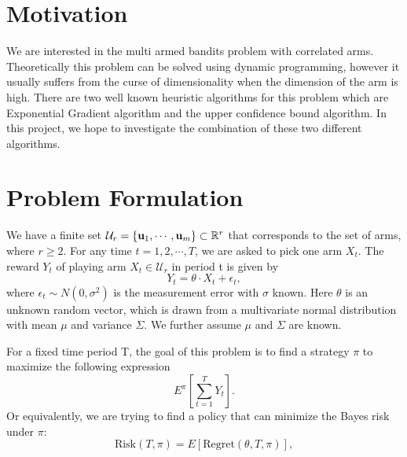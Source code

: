 \documentclass{article}
\begin{document}
 


\section{Motivation}
We are interested in the multi armed bandits problem with correlated arms. Theoretically this problem can be solved using dynamic programming, however it usually suffers from the curse of dimensionality when the dimension of the arm is high. There are two well known heuristic algorithms for this problem which are Exponential Gradient algorithm and the upper confidence bound algorithm. In this project, we hope to investigate the combination of these two different algorithms.


\section{Problem Formulation}
We have a finite set $\mathcal{U}_{r}=\{\bold{u}_{1},\cdots,\bold{u}_{m}\}\subset \mathbb{R}^{r}$ that corresponds to the set of arms, where $r\geq 2$. For any time $t=1,2,\cdots,T$, we are asked to pick one arm $X_{t}$. The reward $Y_{t}$ of playing arm $X_{t}\in \mathcal{U}_{r}$ in period t is given by
\begin{equation}
Y_{t} = \theta \cdot X_{t} + \epsilon_{t}, \nonumber
\end{equation}
where $\epsilon_{t}\sim N(0,\sigma^{2})$ is the measurement error with $\sigma$ known. Here $\theta$ is an unknown random vector, which is drawn from a multivariate normal distribution with mean $\mu$ and variance $\Sigma$. We further assume $\mu$ and $\Sigma$ are known.

For a fixed time period T, the goal of this problem is to find a strategy $\pi$ to maximize the following expression
\begin{equation}
E^{\pi}\left[\sum_{t=1}^{T} Y_{t}\right].
\end{equation}
Or equivalently, we are trying to find a policy that can minimize the Bayes risk under $\pi$:
\begin{equation}
\text{Risk}(T,\pi) = E\left[\text{Regret}(\theta,T,\pi)\right],
\end{equation}
\end{document}

